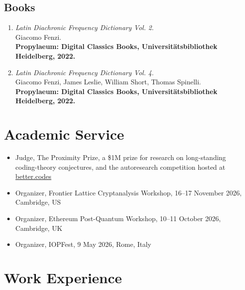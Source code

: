 \documentclass[11pt,a4paper]{article}
\begin{document}
\subsection*{Books}
\begin{enumerate}
  \item \textit{Latin Diachronic Frequency Dictionary Vol. 2.}\\
  Giacomo Fenzi.\\
  \textbf{Propylaeum: Digital Classics Books, Universitätsbibliothek Heidelberg, 2022.}

  \item \textit{Latin Diachronic Frequency Dictionary Vol. 4.}\\
  Giacomo Fenzi, James Leslie, William Short, Thomas Spinelli.\\
  \textbf{Propylaeum: Digital Classics Books, Universitätsbibliothek Heidelberg, 2022.}
\end{enumerate}

\section*{Academic Service}
\begin{itemize}
  \item Judge, The Proximity Prize, a \$1M prize for research on long-standing coding-theory conjectures, and the autoresearch competition hosted at \href{https://better.codes}{better.codes}
  \item Organizer, Frontier Lattice Cryptanalysis Workshop, 16--17 November 2026, Cambridge, US
  \item Organizer, Ethereum Post-Quantum Workshop, 10--11 October 2026, Cambridge, UK
  \item Organizer, IOPFest, 9 May 2026, Rome, Italy
\end{itemize}

\section*{Work Experience}
\end{document}
